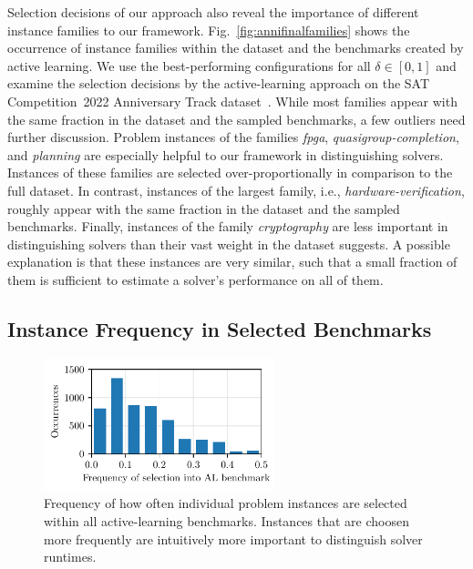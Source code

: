 \documentclass[sn-basic, Numbered]{sn-jnl} %
\begin{document}
Selection decisions of our approach also reveal the importance of different instance families to our framework.
Fig.~\ref{fig:annifinalfamilies} shows the occurrence of instance families within the dataset and the benchmarks created by active learning.
We use the best-performing configurations for all $\delta \in \left[0, 1\right]$ and examine the selection decisions by the active-learning approach on the SAT Competition~2022 Anniversary Track dataset~\cite{sat2022}.
While most families appear with the same fraction in the dataset and the sampled benchmarks, a few outliers need further discussion.
Problem instances of the families \emph{fpga}, \emph{quasigroup-completion}, and \emph{planning} are especially helpful to our framework in distinguishing solvers.
Instances of these families are selected over-proportionally in comparison to the full dataset.
In contrast, instances of the largest family, i.e., \emph{hardware-verification}, roughly appear with the same fraction in the dataset and the sampled benchmarks.
Finally, instances of the family \emph{cryptography} are less important in distinguishing solvers than their vast weight in the dataset suggests.
A possible explanation is that these instances are very similar, such that a small fraction of them is sufficient to estimate a solver's performance on all of them.

\subsection{Instance Frequency in Selected Benchmarks}
\label{sec:eval:inst-freq}

\begin{figure}
  \centering
  \includegraphics[width=0.6\textwidth]{../plots/instoccs.pdf}
  \caption{Frequency of how often individual problem instances are selected within all active-learning benchmarks. Instances that are choosen more frequently are intuitively more important to distinguish solver runtimes.}
\end{figure}
\end{document}
